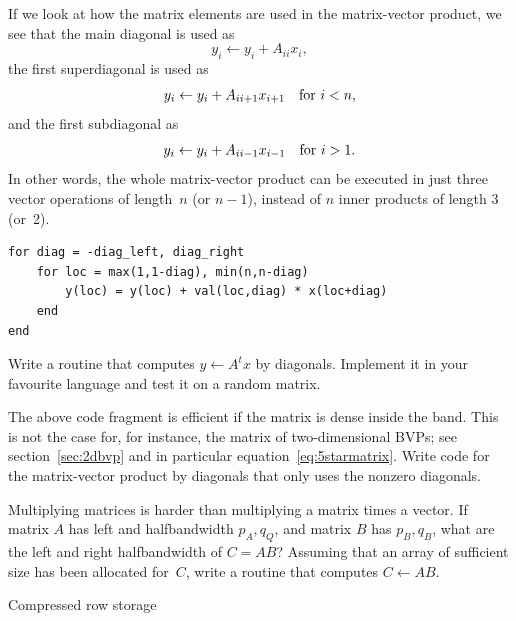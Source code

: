 If we look at how the matrix elements are used in the matrix-vector
product, we see that the main diagonal is used as
\[ y_i \leftarrow y_i + A_{ii} x_i, \]
the first superdiagonal is used as
\[ y_i \leftarrow y_i + A_{ii+1} x_{i+1}\quad\hbox{for $i<n$}, \]
and the first subdiagonal as
\[ y_i \leftarrow y_i + A_{ii-1} x_{i-1}\quad\hbox{for $i>1$}. \]
In other words, the whole matrix-vector product can be executed in
just three vector operations of length~$n$ (or $n-1$), instead of $n$
inner products of length 3 (or~2).

\begin{verbatim}
for diag = -diag_left, diag_right
    for loc = max(1,1-diag), min(n,n-diag)
        y(loc) = y(loc) + val(loc,diag) * x(loc+diag)
    end
end
\end{verbatim}

\begin{exercise}
  Write a routine that computes $y\leftarrow A^tx$ by
  diagonals. Implement it in your favourite language and test it on a
  random matrix.
\end{exercise}
\begin{exercise}
  The above code fragment is efficient if the matrix is dense inside
  the band. This is not the case for, for instance, the matrix of 
  two-dimensional \acp{BVP}; see section~\ref{sec:2dbvp} and in
  particular equation~\eqref{eq:5starmatrix}. Write code for the
  matrix-vector product by diagonals that only
  uses the nonzero diagonals.
\end{exercise}
\begin{exercise}
  Multiplying matrices is harder than multiplying a matrix times a
  vector. If matrix $A$ has left and halfbandwidth $p_A,q_Q$, and
  matrix $B$ has $p_B,q_B$, what are the left and right halfbandwidth
  of $C=AB$? Assuming that an array of sufficient size has been
  allocated for~$C$, write a routine that computes $C\leftarrow AB$.
\end{exercise}


 {Compressed row storage}
\label{sec:crs}

